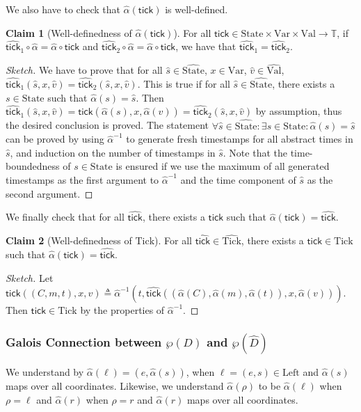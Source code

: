 \documentclass{article}
\theoremstyle{definition}
\newtheorem{clm}{Claim}[section]
\newcommand*{\A}[1]{\widehat{#1}}
\newcommand*{\ExprVar}{\text{Var}}
\newcommand*{\Time}{\mathbb{T}}
\newcommand*{\Value}{\text{Val}}
\newcommand*{\Left}{\text{Left}}
\newcommand*{\mem}{m}
\newcommand*{\State}{\text{State}}
\newcommand*{\Tick}{\text{Tick}}
\newcommand*{\tick}{\mathsf{tick}}
\begin{document}
We also have to check that $\widehat{\alpha}(\tick)$ is well-defined.

\begin{clm}[Well-definedness of $\widehat{\alpha}(\tick)$]
  For all $\tick\in\State\times\ExprVar\times\Value\rightarrow\Time$, if $\widehat{\tick}_1\circ\widehat{\alpha}=\widehat{\alpha}\circ\tick$ and $\widehat{\tick}_2\circ\widehat{\alpha}=\widehat{\alpha}\circ\tick$, we have that $\A\tick_1=\A\tick_2$.
\end{clm}
\begin{proof}[Sketch]
  We have to prove that for all $\A{s}\in\A\State$, $x\in\ExprVar$, $\A{v}\in\A\Value$, $\A\tick_1(\A{s},x,\A{v})=\A\tick_2(\A{s},x,\A{v})$.
  This is true if for all $\A{s}\in\A\State$, there exists a $s\in\State$ such that $\A\alpha(s)=\A{s}$.
  Then $\A\tick_1(\A{s},x,\A{v})=\tick(\A\alpha(s),x,\A\alpha(v))=\A\tick_2(\A{s},x,\A{v})$ by assumption, thus the desired conclusion is proved.
  The statement $\forall\A{s}\in\A\State:\exists s\in\State:\A\alpha(s)=\A{s}$ can be proved by using $\A\alpha^{-1}$ to generate fresh timestamps for all abstract times in $\A{s}$, and induction on the number of timestamps in $\A{s}$.
  Note that the time-boundedness of $s\in\State$ is ensured if we use the maximum of all generated timestamps as the first argument to $\A\alpha^{-1}$ and the time component of $\A{s}$ as the second argument.
\end{proof}

We finally check that for all $\A\tick$, there exists a $\tick$ such that $\A\alpha(\tick)=\A\tick$.

\begin{clm}[Well-definedness of $\Tick$]
  For all $\A\tick\in\A\Tick$, there exists a $\tick\in\Tick$ such that $\A\alpha(\tick)=\A\tick$.
\end{clm}
\begin{proof}[Sketch]
  Let $\tick((C,\mem,t),x,v)\triangleq\A\alpha^{-1}(t,\A\tick((\A\alpha(C),\A\alpha(m),\A\alpha(t)),x,\A\alpha(v)))$. Then $\tick\in\Tick$ by the properties of $\A\alpha^{-1}$.
\end{proof}

\subsubsection{Galois Connection between $\wp(D)$ and $\wp(\A{D})$}
We understand by $\A\alpha(\ell)=(e,\A\alpha(s))$, when $\ell=(e,s)\in\Left$ and $\A\alpha(s)$ maps over all coordinates.
Likewise, we understand $\A\alpha(\rho)$ to be $\A\alpha(\ell)$ when $\rho=\ell$ and $\A\alpha(r)$ when $\rho=r$ and $\A\alpha(r)$ maps over all coordinates.
\end{document}
